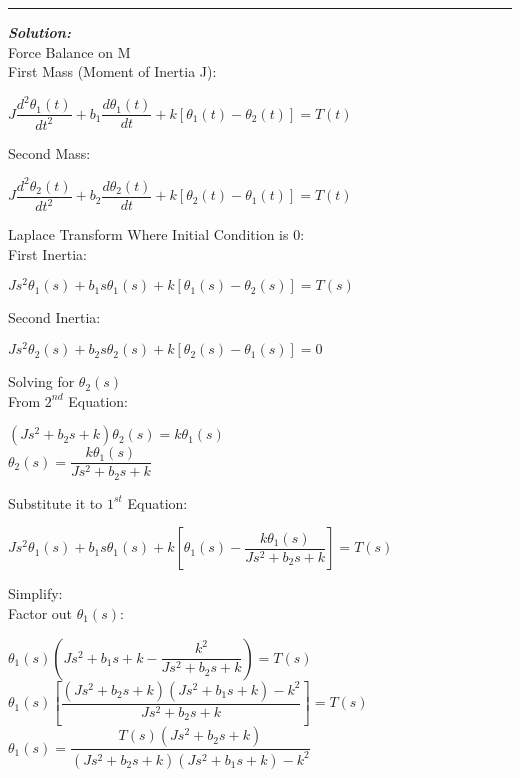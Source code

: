 \documentclass[11pt,letterpaper]{article}
\begin{document}
\rule{\textwidth}{1pt}
\vspace{12pt}
\textit{\textbf{Solution:}}\\
Force Balance on M\\[12pt]
First Mass (Moment of Inertia J):\\
\begin{center}
	$J\dfrac{d^2\theta_1(t)}{dt^2}+b_1\dfrac{d\theta_1(t)}{dt}+k[\theta_1(t)-\theta_2(t)]=T(t)$\\
\end{center}
Second Mass:\\
\begin{center}
	$J\dfrac{d^2\theta_2(t)}{dt^2}+b_2\dfrac{d\theta_2(t)}{dt}+k[\theta_2(t)-\theta_1(t)]=T(t)$\\
\end{center}
Laplace Transform Where Initial Condition is $0$:\\[12pt]
First Inertia:\\
\begin{center}
	$Js^2\theta_1(s)+b_1s\theta_1(s)+k[\theta_1(s)-\theta_2(s)]=T(s)$\\
\end{center}
Second Inertia:\\
\begin{center}
	$Js^2\theta_2(s)+b_2s\theta_2(s)+k[\theta_2(s)-\theta_1(s)]=0$\\
\end{center}
Solving for $\theta_2(s)$\\[12pt]
From $2^{nd}$ Equation:\\
\begin{center}
	$(Js^2+b_2s+k)\theta_2(s)=k\theta_1(s)$\\[12pt]
	$\theta_2(s)=\dfrac{k\theta_1(s)}{Js^2+b_2s+k}$\\
\end{center}
Substitute it to $1^{st}$ Equation:\\
\begin{center}
	$Js^2\theta_1(s)+b_1s\theta_1(s)+k[\theta_1(s)-\dfrac{k\theta_1(s)}{Js^2+b_2s+k}]=T(s)$\\
\end{center}
Simplify:\\[12pt]
Factor out $\theta_1(s)$:\\
\begin{center}
	$\theta_1(s)\left(Js^2+b_1s+k-\dfrac{k^2}{Js^2+b_2s+k}\right)=T(s) $\\[12pt]
	$\theta_1(s)\left[\dfrac{(Js^2+b_2s+k)(Js^2+b_1s+k)-k^2}{Js^2+b_2s+k}\right]=T(s) $\\[12pt]
	$\theta_1(s)=\dfrac{T(s)(Js^2+b_2s+k)}{(Js^2+b_2s+k)(Js^2+b_1s+k)-k^2} $\\[12pt]
\end{center}
\end{document}
